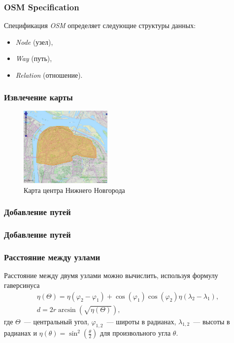 \documentclass{beamer}
\begin{document}
\begin{frame}
\frametitle{OSM Specification}
Спецификация \textit{OSM} определяет следующие структуры данных:
\begin{itemize}
\item \textit{Node} (узел),
\item \textit{Way} (путь),
\item \textit{Relation} (отношение).
\end{itemize}
\end{frame}

\begin{frame}
\frametitle{Извлечение карты}
\begin{figure}[ht]
	\centering	
	\includegraphics[width=0.4\textwidth]{images/bbbike.png}
	\caption{Карта центра Нижнего Новгорода}
	\label{fig:bbbike}
	\end{figure}
\end{frame}

\begin{frame}[fragile]
\frametitle{Добавление путей}

\end{frame}

\begin{frame}[fragile]
\frametitle{Добавление путей}

\end{frame}

\begin{frame}
\frametitle{Расстояние между узлами}
Расстояние между двумя узлами можно вычислить, используя формулу гаверсинуса
\begin{gather*}
	\eta(\Theta) = \eta(\varphi_2 - \varphi_1) + \cos(\varphi_1) \cos(\varphi_2) \eta(\lambda_2 - \lambda_1), \\
	d = 2r \arcsin(\sqrt{\eta(\Theta)}),
\end{gather*}
	где $ \Theta $~--- центральный угол, $ \varphi_{1,2} $~--- широты в радианах, $ \lambda_{1,2} $~--- высоты в радианах и $ \eta(\theta) = \sin^2\left(\frac{\theta}{2}\right) $ для произвольного угла $ \theta $.
\end{frame}
\end{document}
